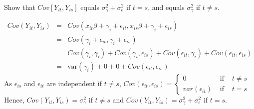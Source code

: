 \documentclass[11pt,a4paper%
addpoints, 
answers%
]{exam}
\begin{document}
\begin{questions}
\question[3] Show that $Cov[Y_{it},Y_{is}]$ equals $\sigma^2_\gamma+\sigma^2_\epsilon$ if $t=s$, and equals $\sigma^2_\gamma$ if $t\neq s$.
\begin{solution}
$$
\begin{array}{ccl}
Cov(Y_{it}, Y_{is}) & = & Cov(x_{it}\beta + \gamma_i + \epsilon_{it}, x_{is}\beta + \gamma_i + \epsilon_{is})\\
 & = & Cov(\gamma_i + \epsilon_{it}, \gamma_i + \epsilon_{is})\\
 & = & Cov(\gamma_i, \gamma_i) + Cov(\gamma_i, \epsilon_{is}) + Cov(\epsilon_{it}, \gamma_i) + Cov(\epsilon_{it}, \epsilon_{is})\\
 & = & \textrm{var}(\gamma_i) + 0 + 0 + Cov(\epsilon_{it}, \epsilon_{is})
 \end{array}
 $$
 As $\epsilon_{is}$ and $\epsilon_{it}$ are independent if $t\neq s$, $Cov(\epsilon_{it}, \epsilon_{is}) = \left\{\begin{array}{ccl} 0 &\,\,\textrm{if}\,\, & t \neq s\\ var(\epsilon_{it}) & \,\,\textrm{if}\,\, & t = s\end{array}\right.$
 Hence, $Cov(Y_{it}, Y_{is}) = \sigma_\gamma^2$ if $t\neq s$ and $Cov(Y_{it}, Y_{is}) = \sigma_\gamma^2 + \sigma_\epsilon^2$ if $t =s$. 

\end{solution}


\end{questions}
\end{document}
